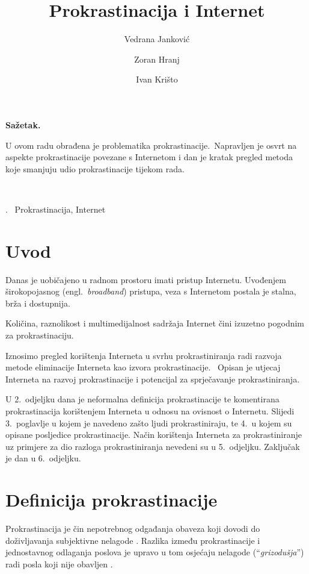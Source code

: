 \documentclass[11pt,twocolumn,english]{article}
\let\LaTeXtitle\title
\renewcommand{\title}[1]{\LaTeXtitle{\Large \textbf{#1}}}
\renewenvironment{abstract}
{\noindent \large \bf Sažetak.\normalsize\begin{it}}
{\end{it}\\}
\newenvironment{keywords}
{\noindent {\large {\bf Ključne riječi}}.~}{}
\newcommand{\engl}[1]{(engl.~\emph{#1})}
\begin{document}
\title{Prokrastinacija i Internet}
\author{Vedrana Janković}
\author{Zoran Hranj}
\author{Ivan Krišto}

\date{}

\maketitle
\thispagestyle{empty}
\pagestyle{empty}

\begin{abstract}

U ovom radu obrađena je problematika prokrastinacije.~Napravljen je 
osvrt na aspekte prokrastinacije povezane s Internetom i dan je kratak 
pregled metoda koje smanjuju udio prokrastinacije tijekom rada.
\end{abstract}

\begin{keywords}
Prokrastinacija, Internet
\end{keywords}


\section{Uvod}
Danas je uobičajeno u radnom prostoru imati pristup Internetu. Uvođenjem
širokopojasnog \engl{broadband} pristupa, veza s Internetom postala je stalna,
brža i dostupnija.

Količina, raznolikost i multimedijalnost sadržaja Internet čini izuzetno
pogodnim za prokrastinaciju.

Iznosimo pregled korištenja Interneta u svrhu prokrastiniranja radi razvoja
metode eliminacije Interneta kao izvora prokrastinacije.~ Opisan je utjecaj 
Interneta na razvoj prokrastinacije i potencijal za sprječavanje prokrastiniranja.

U 2.~odjeljku dana je neformalna definicija prokrastinacije te komentirana
prokrastinacija korištenjem Interneta u odnosu na ovisnost o Internetu. Slijedi
3.~poglavlje u kojem je navedeno zašto ljudi prokrastiniraju, te 4.~u kojem su
opisane posljedice prokrastinacije. Način korištenja Interneta za
prokrastiniranje uz primjere za dio razloga prokrastiniranja nevedeni su u
5.~odjeljku. Zaključak je dan u 6.~odjeljku.


\section{Definicija prokrastinacije}
Prokrastinacija je čin nepotrebnog odgađanja obaveza koji dovodi do 
doživljavanja subjektivne nelagode \cite{solomon1984academic}. Razlika između
prokrastinacije i jednostavnog odlaganja poslova je upravo u tom osjećaju
nelagode (``\emph{grizodušja}'') radi posla koji nije obavljen
\cite{burka2004procrastination}.
\end{document}
